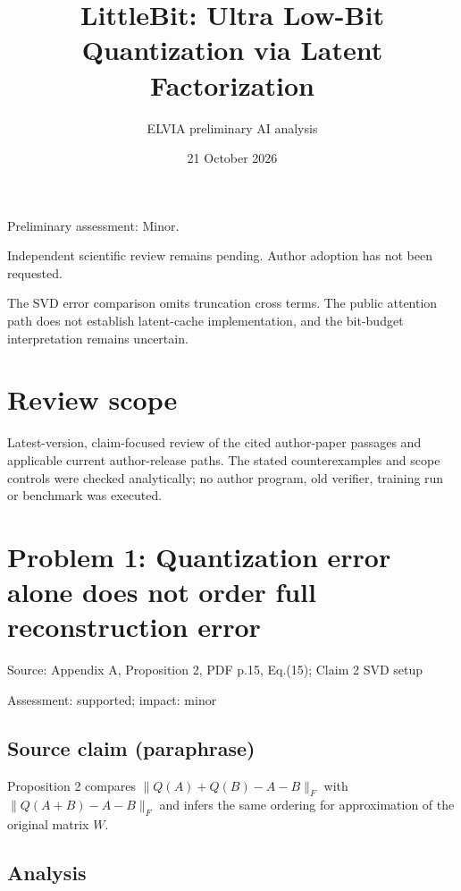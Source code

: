 \documentclass[11pt]{article}
\begin{document}
\title{LittleBit: Ultra Low-Bit Quantization via Latent Factorization}

\author{ELVIA preliminary AI analysis}\date{21 October 2026}\maketitle

Preliminary assessment: Minor.\par

Independent scientific review remains pending. Author adoption has not been requested.

The SVD error comparison omits truncation cross terms. The public attention path does not establish latent-cache implementation, and the bit-budget interpretation remains uncertain.

\section*{Review scope}

Latest-version, claim-focused review of the cited author-paper passages and applicable current author-release paths. The stated counterexamples and scope controls were checked analytically; no author program, old verifier, training run or benchmark was executed.

\section*{Problem 1: Quantization error alone does not order full reconstruction error}

Source: Appendix A, Proposition 2, PDF p.15, Eq.(15); Claim 2 SVD setup

Assessment: supported; impact: minor

\subsection*{Source claim (paraphrase)}

Proposition 2 compares \(\|Q(A)+Q(B)-A-B\|_F\) with \(\|Q(A+B)-A-B\|_F\) and infers the same ordering for approximation of the original matrix \(W\).

\subsection*{Analysis}
\end{document}
